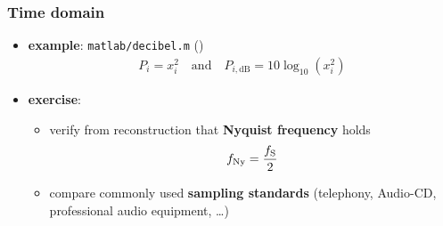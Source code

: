 \begin{frame} %
	\frametitle{Time domain}
	\begin{itemize}
		\item \textbf{example}: \texttt{matlab/decibel.m} ()
			\begin{align*}
				P_i=x_i^2\quad\textrm{and}\quad P_{i,\textrm{dB}}=10\log_{10}(x_i^2)
			\end{align*}
			\begin{figure}
				\centering
				\begin{subfigure}[c]{0.48\linewidth}
				\end{subfigure}
				\hspace{0.01\linewidth}
				\begin{subfigure}[c]{0.48\linewidth}
				\end{subfigure}
			\end{figure}
		\item \textbf{exercise}:
			\begin{itemize}
				\item verify from reconstruction that \textbf{Nyquist frequency} holds
					\begin{align*}
						f_{\textrm{Ny}}=\frac{f_{\textrm S}}2
					\end{align*}
				\item compare commonly used \textbf{sampling standards} (telephony, Audio-CD, professional audio equipment, \ldots)
			\end{itemize}
	\end{itemize}
\end{frame}

